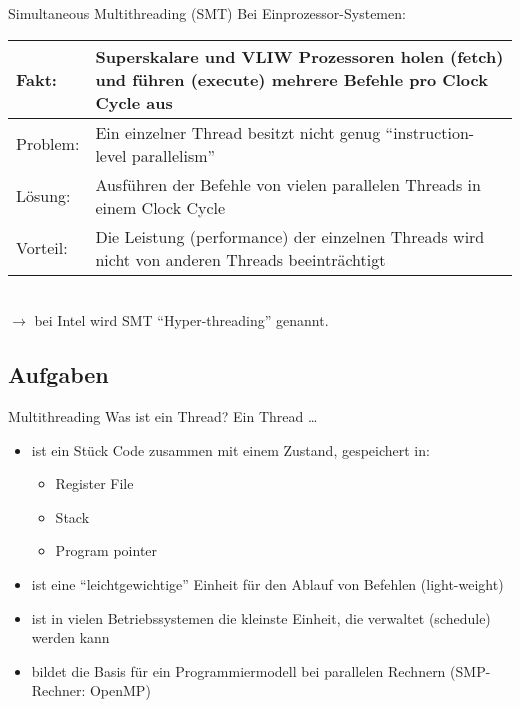 \begin{defi}[Threads]{Simultaneous Multithreading (SMT)}
    Bei Einprozessor-Systemen: \\
    \begin{tabularx}{\textwidth}{|lX|}
        \toprule
        Fakt:    & Superskalare und VLIW Prozessoren holen (fetch) und führen (execute) mehrere Befehle pro Clock Cycle aus \\
        \midrule
        Problem: & Ein einzelner Thread besitzt nicht genug \enquote{instruction-level parallelism}                         \\
        \midrule
        Lösung:  & Ausführen der Befehle von vielen parallelen Threads in einem Clock Cycle                                 \\
        \midrule
        Vorteil: & Die Leistung (performance) der einzelnen Threads wird nicht von anderen Threads beeinträchtigt           \\
        \bottomrule
    \end{tabularx}
    \\
    $\to$ bei Intel wird SMT \enquote{Hyper-threading} genannt.
\end{defi}

\subsection{Aufgaben}

\begin{aufgabe}{Multithreading}
    Was ist ein Thread?
    \tcblower
    Ein Thread \ldots
    \begin{itemize}[$\ldots$]
        \item ist ein Stück Code zusammen mit einem Zustand, gespeichert in:
              \begin{itemize}
                  \item Register File
                  \item Stack
                  \item Program pointer
              \end{itemize}
        \item ist eine \enquote{leichtgewichtige} Einheit für den Ablauf von Befehlen (light-weight)
        \item ist in vielen Betriebssystemen die kleinste Einheit, die verwaltet (schedule) werden kann
        \item bildet die Basis für ein Programmiermodell bei parallelen Rechnern (SMP-Rechner: OpenMP)
    \end{itemize}
\end{aufgabe}

